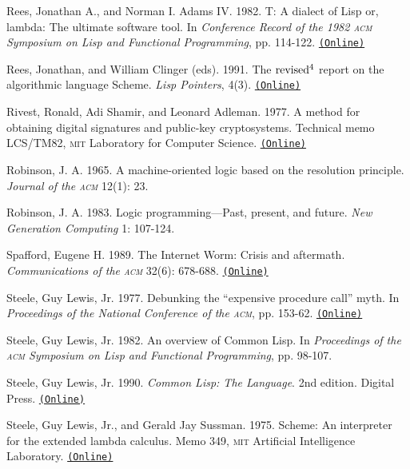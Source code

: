 \documentclass[oneside]{book}
\newcommand{\acronym}[1]{\textsc{\MakeLowercase{#1}}}
\newcommand{\code}[1]{\texttt{#1}}
\begin{document}
 \label{Rees and Adams 1982}
Rees, Jonathan A., and Norman I. Adams IV. 1982.  T: A dialect of Lisp or,
lambda: The ultimate software tool.  In \textit{Conference Record of the 1982
\acronym{ACM} Symposium on Lisp and Functional Programming}, pp.  114-122.
\href{http://people.csail.mit.edu/riastradh/t/adams82t.pdf}{\code{(Online)}}

Rees, Jonathan, and William Clinger (eds). 1991.  The \( \rm revised^4 \) report on the
algorithmic language Scheme.  \textit{Lisp Pointers}, 4(3).
\href{http://people.csail.mit.edu/jaffer/r4rs_toc.html}{\code{(Online)}}

 \label{Rivest et al. (1977)}
Rivest, Ronald, Adi Shamir, and Leonard Adleman.  1977.  A method for obtaining
digital signatures and public-key cryptosystems. Technical memo LCS/TM82,
\acronym{MIT} Laboratory for Computer Science.
\href{http://people.csail.mit.edu/rivest/Rsapaper.pdf}{\code{(Online)}}

 \label{Robinson 1965}
Robinson, J. A. 1965.  A machine-oriented logic based on the resolution
principle.  \textit{Journal of the \acronym{ACM}} 12(1): 23.

 \label{Robinson 1983}
Robinson, J. A. 1983.  Logic programming---Past, present, and future.
\textit{New Generation Computing} 1: 107-124.

 \label{Spafford 1989}
Spafford, Eugene H.  1989.  The Internet Worm: Crisis and aftermath.
\textit{Communications of the \acronym{ACM}} 32(6): 678-688.
\href{http://citeseerx.ist.psu.edu/viewdoc/download?doi=10.1.1.123.8503&rep=rep1&type=pdf}{\code{(Online)}}

 \label{Steele 1977}
Steele, Guy Lewis, Jr.  1977.  Debunking the ``expensive procedure call'' myth.
In \textit{Proceedings of the National Conference of the \acronym{ACM}},
pp. 153-62.
\href{http://dspace.mit.edu/handle/1721.1/5753}{\code{(Online)}}

 \label{Steele 1982}
Steele, Guy Lewis, Jr.  1982.  An overview of Common Lisp.  In
\textit{Proceedings of the \acronym{ACM} Symposium on Lisp and Functional
Programming}, pp. 98-107.

 \label{Steele 1990}
Steele, Guy Lewis, Jr.  1990.  \textit{Common Lisp: The Language}. 2nd edition.
Digital Press.
\href{http://www.cs.cmu.edu/Groups/AI/html/cltl/cltl2.html}{\code{(Online)}}

 \label{Steele and Sussman 1975}
Steele, Guy Lewis, Jr., and Gerald Jay Sussman.  1975.  Scheme: An interpreter
for the extended lambda calculus.  Memo 349, \acronym{MIT} Artificial
Intelligence Laboratory.
\href{http://dspace.mit.edu/handle/1721.1/5794}{\code{(Online)}}
\end{document}
